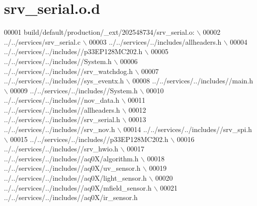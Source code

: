 \hypertarget{a00064_source}{\section{srv\+\_\+serial.\+o.\+d}
\label{a00064_source}
}

\begin{DoxyCode}
00001 build/\textcolor{keywordflow}{default}/production/\_ext/202548734/srv\_serial.o:  \(\backslash\)
00002  ../../services/srv\_serial.c  \(\backslash\)
00003 ../../services/../includes/allheaders.h  \(\backslash\)
00004 ../../services/../includes\textcolor{comment}{//p33EP128MC202.h  \(\backslash\)}
00005 \textcolor{comment}{../../services/../includes//System.h  \(\backslash\)}
00006 \textcolor{comment}{../../services/../includes//srv\_watchdog.h  \(\backslash\)}
00007 \textcolor{comment}{../../services/../includes//sys\_eventx.h  \(\backslash\)}
00008 \textcolor{comment}{../../services/../includes//main.h  \(\backslash\)}
00009 \textcolor{comment}{../../services/../includes//System.h  \(\backslash\)}
00010 \textcolor{comment}{../../services/../includes//nov\_data.h  \(\backslash\)}
00011 \textcolor{comment}{../../services/../includes//allheaders.h  \(\backslash\)}
00012 \textcolor{comment}{../../services/../includes//srv\_serial.h  \(\backslash\)}
00013 \textcolor{comment}{../../services/../includes//srv\_nov.h  \(\backslash\)}
00014 \textcolor{comment}{../../services/../includes//srv\_spi.h  \(\backslash\)}
00015 \textcolor{comment}{../../services/../includes//p33EP128MC202.h  \(\backslash\)}
00016 \textcolor{comment}{../../services/../includes//srv\_hwio.h  \(\backslash\)}
00017 \textcolor{comment}{../../services/../includes//aq0X/algorithm.h  \(\backslash\)}
00018 \textcolor{comment}{../../services/../includes//aq0X/uv\_sensor.h  \(\backslash\)}
00019 \textcolor{comment}{../../services/../includes//aq0X/light\_sensor.h  \(\backslash\)}
00020 \textcolor{comment}{../../services/../includes//aq0X/mfield\_sensor.h  \(\backslash\)}
00021 \textcolor{comment}{../../services/../includes//aq0X/ir\_sensor.h }
\end{DoxyCode}
